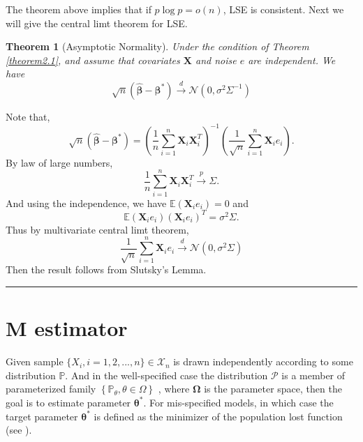 \documentclass[12pt]{article}
\numberwithin{equation}{section}
\newtheorem{theorem}{Theorem}[section]
\newenvironment{proof}{{\bf Proof:}}{\hfill\rule{2mm}{2mm}}
\begin{document}
The theorem above implies that if $p\log p=o(n)$, LSE is consistent. Next we will give the central limt theorem for LSE.
\begin{theorem}[Asymptotic Normality]
	Under the condition of Theorem \ref{theorem2.1}, and assume that covariates $\boldsymbol{X}$ and noise $e$ are independent. We have
	\begin{equation}
	\sqrt{n}\left(\boldsymbol{\widehat{\beta}}-\boldsymbol{\beta}^{*}\right) \stackrel{d}{\longrightarrow} \mathcal{N}\left(0, \sigma^2\Sigma^{-1}\right)
	\end{equation}
\end{theorem}
\begin{proof}
	Note that,
	\begin{equation}
	\sqrt{n}\left(\boldsymbol{\widehat{\beta}}-\boldsymbol{\beta}^{*}\right)=\left(\frac{1}{n}\sum_{i=1}^{n}\boldsymbol{X}_i\boldsymbol{X}_i^T\right)^{-1}\left(\frac{1}{\sqrt{n}}\sum_{i=1}^n\boldsymbol{X}_ie_i\right).
	\end{equation}
	By law of large numbers,
	$$
	\frac{1}{n}\sum_{i=1}^{n}\boldsymbol{X}_i\boldsymbol{X}_i^T\stackrel{p}{\longrightarrow}\Sigma.
	$$
	And using the independence, we have $\mathbb{E}\left(\boldsymbol{X}_ie_i\right)=0$ and
	$$
	\mathbb{E}\left(\boldsymbol{X}_ie_i\right)\left(\boldsymbol{X}_ie_i\right)^T=\sigma^2\Sigma.
	$$
	Thus by multivariate central limt theorem,
	$$
	\frac{1}{\sqrt{n}}\sum_{i=1}^n\boldsymbol{X}_ie_i\stackrel{d}{\longrightarrow}\mathcal{N}\left(0,\sigma^2\Sigma\right)
	$$
	Then the result follows from Slutsky's Lemma.
\end{proof}

\section{M estimator}\label{section3}
Given sample $\{X_i,i=1,2,...,n\}\in \mathcal{X}_n$ is drawn independently according to
some distribution $\mathbb{P}$. And in the well-specified case the distribution
$\mathcal{P}$ is a member of parameterized family $\left\{\mathbb{P}_{\theta}, \theta \in \Omega\right\}$ , where $\boldsymbol{\Omega}$ is the parameter space, then the goal is to estimate parameter $\boldsymbol{\theta}^{*}$. For mis-specified models, in which case the target parameter $\boldsymbol{\theta}^{*}$ is defined as the minimizer of the population lost function (see \citet{wainwright2019high}). 
\end{document}
